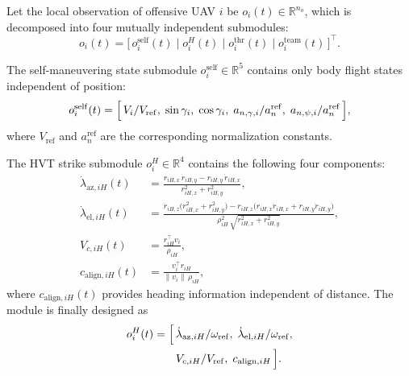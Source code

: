 \documentclass{cja}
\begin{document}
Let the local observation of offensive UAV $i$ be $o_i(t)\in\mathbb{R}^{n_o}$, which is decomposed into four mutually independent submodules:
\begin{equation}
o_i(t)=\bigl[\,o_i^{\mathrm{self}}(t)\;\big|\;o_i^{H}(t)\;\big|\;o_i^{\mathrm{thr}}(t)\;\big|\;o_i^{\mathrm{team}}(t)\,\bigr]^{\top}.
\label{eq:obs-decomp}
\end{equation}

The self-maneuvering state submodule $o_i^{\mathrm{self}}\in\mathbb{R}^{5}$ contains only body flight states independent of position:
\begin{equation}
o_i^{\mathrm{self}}(t)=\Bigl[\,V_i/V_{\mathrm{ref}},\;\sin\gamma_i,\;\cos\gamma_i,\;a_{n,\gamma,i}/a^{\mathrm{ref}}_n,\;a_{n,\psi,i}/a^{\mathrm{ref}}_n\,\Bigr],
\label{eq:obs-self}
\end{equation}
where $V_{\mathrm{ref}}$ and $a^{\mathrm{ref}}_n$ are the corresponding normalization constants.

The HVT strike submodule $o_i^{H}\in\mathbb{R}^{4}$ contains the following four components:
\begin{align}
\dot\lambda_{\mathrm{az},iH}(t)&=\frac{r_{iH,x}\,\dot r_{iH,y}-r_{iH,y}\,\dot r_{iH,x}}{r_{iH,x}^{2}+r_{iH,y}^{2}},
\label{eq:los-az}\\
\dot\lambda_{\mathrm{el},iH}(t)&=\frac{\dot r_{iH,z}\bigl(r_{iH,x}^{2}+r_{iH,y}^{2}\bigr)
-r_{iH,z}\bigl(r_{iH,x}\dot r_{iH,x}+r_{iH,y}\dot r_{iH,y}\bigr)}{\rho_{iH}^{2}\,\sqrt{r_{iH,x}^{2}+r_{iH,y}^{2}}},
\label{eq:los-el}\\
V_{c,iH}(t)&=\frac{r_{iH}^{\top}v_i}{\rho_{iH}},
\label{eq:vc-h}\\
c_{\mathrm{align},iH}(t)&=\frac{v_i^{\top}r_{iH}}{\|v_i\|\,\rho_{iH}},
\label{eq:cos-align}
\end{align}
where $c_{\mathrm{align},iH}(t)$ provides heading information independent of distance. The module is finally designed as
\begin{equation}
\begin{aligned}
o_i^{H}(t)=\Bigl[\,&\dot\lambda_{\mathrm{az},iH}/\omega_{\mathrm{ref}},\;
\dot\lambda_{\mathrm{el},iH}/\omega_{\mathrm{ref}},\\
&V_{c,iH}/V_{\mathrm{ref}},\;c_{\mathrm{align},iH}\,\Bigr].
\end{aligned}
\end{equation}
\end{document}
